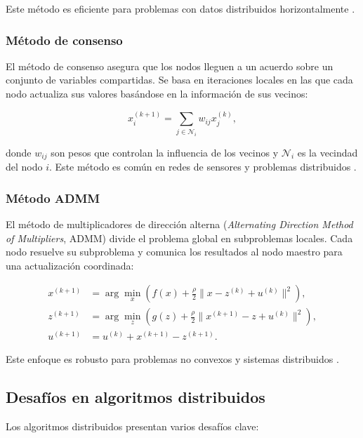 \begin{itemize}
		Este método es eficiente para problemas con datos distribuidos horizontalmente \cite{recht2011hogwild}.
		
		\subsubsection{Método de consenso}
		
		El método de consenso asegura que los nodos lleguen a un acuerdo sobre un conjunto de variables compartidas. Se basa en iteraciones locales en las que cada nodo actualiza sus valores basándose en la información de sus vecinos:
		
		\begin{equation}
			x_i^{(k+1)} = \sum_{j \in \mathcal{N}_i} w_{ij} x_j^{(k)},
		\end{equation}
		
		donde \(w_{ij}\) son pesos que controlan la influencia de los vecinos y \(\mathcal{N}_i\) es la vecindad del nodo \(i\). Este método es común en redes de sensores y problemas distribuidos \cite{boyd2011distributed}.
		
		\subsubsection{Método ADMM}
		
		El método de multiplicadores de dirección alterna (\textit{Alternating Direction Method of Multipliers}, ADMM) divide el problema global en subproblemas locales. Cada nodo resuelve su subproblema y comunica los resultados al nodo maestro para una actualización coordinada:
		
		\begin{align}
			x^{(k+1)} &= \arg \min_x \left( f(x) + \frac{\rho}{2} \|x - z^{(k)} + u^{(k)}\|^2 \right), \\
			z^{(k+1)} &= \arg \min_z \left( g(z) + \frac{\rho}{2} \|x^{(k+1)} - z + u^{(k)}\|^2 \right), \\
			u^{(k+1)} &= u^{(k)} + x^{(k+1)} - z^{(k+1)}.
		\end{align}
		
		Este enfoque es robusto para problemas no convexos y sistemas distribuidos \cite{boyd2011admm}.
		
		\subsection{Desafíos en algoritmos distribuidos}
		
		Los algoritmos distribuidos presentan varios desafíos clave:
		

\end{itemize}
